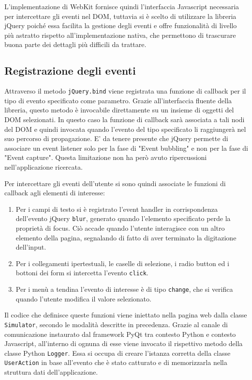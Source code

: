 \documentclass[12pt]{toptesi}
\begin{document}
L'implementazione di WebKit fornisce quindi l'interfaccia Javascript necessaria per intercettare gli eventi nel DOM, tuttavia si è scelto di utilizzare la libreria jQuery poiché essa facilita la gestione degli eventi e offre funzionalità di livello più astratto rispetto all'implementazione nativa, che permettono di trascurare buona parte dei dettagli più difficili da trattare.

\subsection{Registrazione degli eventi}

Attraverso il metodo \verb|jQuery.bind| viene registrata una funzione di callback per il tipo di evento specificato come parametro. Grazie all'interfaccia fluente della libreria, questo metodo è invocabile direttamente su un insieme di oggetti del DOM selezionati. In questo caso la funzione di callback sarà associata a tali nodi del DOM e quindi invocata quando l'evento del tipo specificato li raggiungerà nel suo percorso di propagazione. E' da tenere presente che jQuery permette di associare un event listener solo per la fase di "Event bubbling" e non per la fase di "Event capture". Questa limitazione non ha però avuto ripercussioni nell'applicazione ricercata. 

Per intercettare gli eventi dell'utente si sono quindi associate le funzioni di callback agli elementi di interesse:

\begin{enumerate}
\item Per i campi di testo si è registrato l'event handler in corrispondenza dell'evento jQuery \verb|blur|, generato quando l'elemento specificato perde la proprietà di focus. Ciò accade quando l'utente interagisce con un altro elemento della pagina, segnalando di fatto di aver terminato la digitazione dell'input.

\item Per i collegamenti ipertestuali, le caselle di selezione, i radio button ed i bottoni dei form si intercetta l'evento \verb|click|.

\item Per i menù a tendina l'evento di interesse è di tipo \verb|change|, che si verifica quando l'utente modifica il valore selezionato.

\end{enumerate}

Il codice che definisce queste funzioni viene iniettato nella pagina web dalla classe \verb|Simulator|, secondo le modalità descritte in precedenza. Grazie al canale di comunicazione instaurato dal framework PyQt tra contesto Python e contesto Javascript, all'interno di ognuna di esse viene invocato il rispettivo metodo della classe Python \verb|Logger|. Essa si occupa di creare l'istanza corretta della classe \verb|UserAction| in base all'evento che è stato catturato e di memorizzarla nella struttura dati dell'applicazione.
\end{document}
